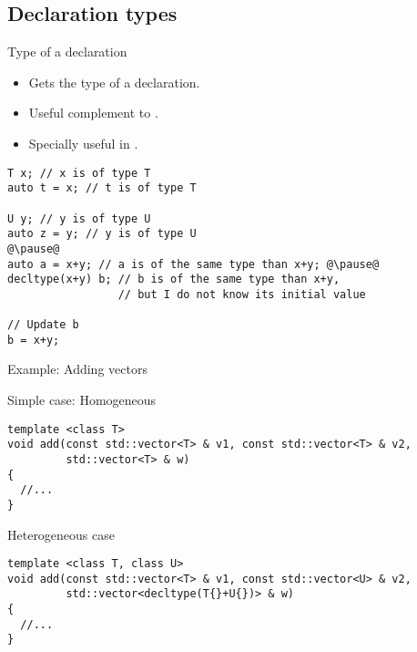 \subsection{Declaration types}

\begin{frame}[t,fragile]{Type of a declaration}
  \begin{itemize}
    \item Gets the type of a declaration.
    \item Useful complement to .
    \item Specially useful in .
  \end{itemize}

\begin{lstlisting}[escapechar=@]
T x; // x is of type T
auto t = x; // t is of type T

U y; // y is of type U
auto z = y; // y is of type U
@\pause@
auto a = x+y; // a is of the same type than x+y; @\pause@
decltype(x+y) b; // b is of the same type than x+y, 
                 // but I do not know its initial value

// Update b
b = x+y;
\end{lstlisting}
\end{frame}

\begin{frame}[t,fragile]{Example: Adding vectors}
\begin{block}{Simple case: Homogeneous}
\begin{lstlisting}
template <class T>
void add(const std::vector<T> & v1, const std::vector<T> & v2,
         std::vector<T> & w) 
{
  //...
}
\end{lstlisting}
\end{block}

\begin{block}{Heterogeneous case}
\begin{lstlisting}
template <class T, class U>
void add(const std::vector<T> & v1, const std::vector<U> & v2,
         std::vector<decltype(T{}+U{})> & w) 
{
  //...
}
\end{lstlisting}
\end{block}
\end{frame}


